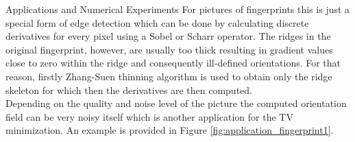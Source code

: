 \begin{chapter}{Applications and Numerical Experiments}
For pictures of fingerprints this is just a special form of edge detection which can be done by calculating discrete derivatives for every pixel using a Sobel or Scharr operator. The ridges in the original fingerprint, however, are usually too thick resulting in gradient values close to zero within the ridge and
consequently ill-defined orientations. For that reason, firstly Zhang-Suen thinning algorithm \cite{zhangsuen} is used to obtain only the ridge skeleton for which then the derivatives are then computed.\\

Depending on the quality and noise level of the picture the computed orientation field can be very noisy itself which is another application
for the TV minimization. An example is provided in Figure \ref{fig:application_fingerprint1}. 


\end{chapter}
